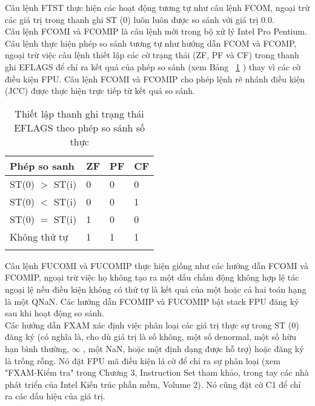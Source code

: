 		Câu lệnh FTST thực hiện các hoạt động tương tự như câu lệnh FCOM, ngoại trừ các giá trị trong thanh ghi ST (0) luôn luôn được so sánh với giá trị 0.0.\\
		
		Câu lệnh FCOMI và FCOMIP là câu lệnh mới trong bộ xử lý Intel Pro Pentium. Câu lệnh thực hiện phép so sánh tương tự như hướng dẫn FCOM và FCOMP, ngoại trừ việc câu lệnh thiết lập các cờ trạng thái (ZF, PF và CF) trong thanh ghi EFLAGS để chỉ ra kết quả của phép so sánh (xem Bảng ~\ref{tb:EFLAGS} ) thay vì các cờ điều kiện FPU. Câu lệnh FCOMI và FCOMIP cho phép lệnh rẽ nhánh điều kiện (JCC) được thực hiện trực tiếp từ kết quả so sánh.
		\begin{longtable}{|l|l|l|l|}
			\hline
				Phép so sanh & ZF & PF & CF \\
			\hline
			\hline
					ST(0) $>$ ST(i) & 0 & 0 & 0 \\	
			\hline
					ST(0) $<$ ST(i) & 0 & 0 & 1 \\	
			\hline
					ST(0) $=$ ST(i) & 1 & 0 & 0 \\	
			\hline
					Không thứ tự & 1 & 1 & 1 \\	
			\hline
				\caption{Thiết lập thanh ghi trạng thái EFLAGS theo phép so sánh số thực}
				\label{tb:EFLAGS}
		\end{longtable}	
		
		Câu lệnh FUCOMI và FUCOMIP thực hiện giống như các hướng dẫn FCOMI và FCOMIP, ngoại trừ việc họ không tạo ra một dấu chấm động không hợp lệ tác ngoại lệ nếu điều kiện không có thứ tự là kết quả của một hoặc cả hai toán hạng là một QNaN. Các hướng dẫn FCOMIP và FUCOMIP bật stack FPU đăng ký sau khi hoạt động so sánh.\\
		
		Các hướng dẫn FXAM xác định việc phân loại các giá trị thực sự trong ST (0) đăng ký (có nghĩa là, cho dù giá trị là số không, một số denormal, một số hữu hạn bình thường, $\mathbb{\infty}$ , một NaN, hoặc một định dạng được hỗ trợ) hoặc đăng ký là trống rỗng. Nó đặt FPU mã điều kiện lá cờ để chỉ ra sự phân loại (xem "FXAM-Kiểm tra" trong Chương 3, Instruction Set tham khảo, trong tay các nhà phát triển của Intel Kiến trúc phần mềm, Volume 2). Nó cũng đặt cờ C1 để chỉ ra các dấu hiệu của giá trị.
		
		\newpage
